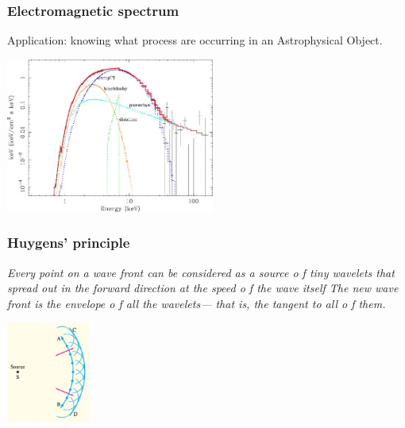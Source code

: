 \documentclass[]{beamer}
\begin{document}
\begin{frame}

\frametitle{Electromagnetic spectrum}

Application: knowing what process are occurring in an Astrophysical Object.

  \begin{center}
  \includegraphics[height=2.0in]{images5/NSspectrum.jpg}
\end{center}



  \end{frame}







\begin{frame}

\frametitle{Huygens' principle}

\textit{Every point on a wave front can be considered as a source o f tiny
wavelets that spread out in the forward direction at the speed o f the wave itself
The new wave front is the envelope o f all the wavelets— that is, the tangent to all
o f them.}

  \begin{center}
  \includegraphics[height=1.3in]{images5/Huygen.jpg}
\end{center}



  \end{frame}




\end{document}
